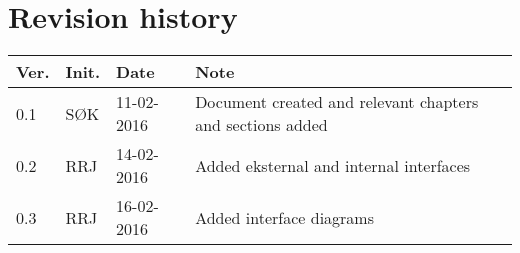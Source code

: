 \label{chp_revisionHistory}
\chapter{Revision history}

\begin{tabular}{b{1cm} b{1cm} b{2cm} b{8cm}}
	\textbf{Ver.} & \textbf{Init.} & \textbf{Date} & \textbf{Note} \\
	\hline
	0.1 & SØK & 11-02-2016 & Document created and relevant chapters and sections added \\
	\hline
	0.2 & RRJ & 14-02-2016 & Added eksternal and internal interfaces \\
	\hline
	0.3 & RRJ & 16-02-2016 & Added interface diagrams \\
	\hline
\end{tabular}

